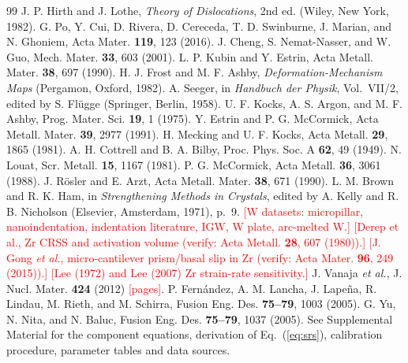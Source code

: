 \documentclass[aps,prl,twocolumn,superscriptaddress,amsmath,amssymb,floatfix]{revtex4-2}
\newcommand{\todo}[1]{\textcolor{red}{[#1]}}
\begin{document}
\begin{thebibliography}{99}
 J. P. Hirth and J. Lothe, \emph{Theory of Dislocations}, 2nd ed. (Wiley, New York, 1982).
 G. Po, Y. Cui, D. Rivera, D. Cereceda, T. D. Swinburne, J. Marian, and N. Ghoniem, Acta Mater. \textbf{119}, 123 (2016).
 J. Cheng, S. Nemat-Nasser, and W. Guo, Mech. Mater. \textbf{33}, 603 (2001).
 L. P. Kubin and Y. Estrin, Acta Metall. Mater. \textbf{38}, 697 (1990).
 H. J. Frost and M. F. Ashby, \emph{Deformation-Mechanism Maps} (Pergamon, Oxford, 1982).
 A. Seeger, in \emph{Handbuch der Physik}, Vol.~VII/2, edited by S. Fl\"ugge (Springer, Berlin, 1958).
 U. F. Kocks, A. S. Argon, and M. F. Ashby, Prog. Mater. Sci. \textbf{19}, 1 (1975).
 Y. Estrin and P. G. McCormick, Acta Metall. Mater. \textbf{39}, 2977 (1991).
 H. Mecking and U. F. Kocks, Acta Metall. \textbf{29}, 1865 (1981).
 A. H. Cottrell and B. A. Bilby, Proc. Phys. Soc. A \textbf{62}, 49 (1949).
 N. Louat, Scr. Metall. \textbf{15}, 1167 (1981).
 P. G. McCormick, Acta Metall. \textbf{36}, 3061 (1988).
 J. R\"osler and E. Arzt, Acta Metall. Mater. \textbf{38}, 671 (1990).
 L. M. Brown and R. K. Ham, in \emph{Strengthening Methods in Crystals}, edited by A. Kelly and R. B. Nicholson (Elsevier, Amsterdam, 1971), p.~9.
 \todo{W datasets: micropillar, nanoindentation, indentation literature, IGW, W plate, arc-melted W.}
 \todo{Derep et al., Zr CRSS and activation volume (verify: Acta Metall. \textbf{28}, 607 (1980)).}
 \todo{J. Gong \emph{et al.}, micro-cantilever prism/basal slip in Zr (verify: Acta Mater. \textbf{96}, 249 (2015)).}
 \todo{Lee (1972) and Lee (2007) Zr strain-rate sensitivity.}
 J. Vanaja \emph{et al.}, J. Nucl. Mater. \textbf{424} (2012) \todo{pages}.
 P. Fern\'andez, A. M. Lancha, J. Lape\~na, R. Lindau, M. Rieth, and M. Schirra, Fusion Eng. Des. \textbf{75--79}, 1003 (2005).
 G. Yu, N. Nita, and N. Baluc, Fusion Eng. Des. \textbf{75--79}, 1037 (2005).
 See Supplemental Material for the component equations, derivation of Eq.~(\ref{eq:srs}), calibration procedure, parameter tables and data sources.
\end{thebibliography}
\end{document}
